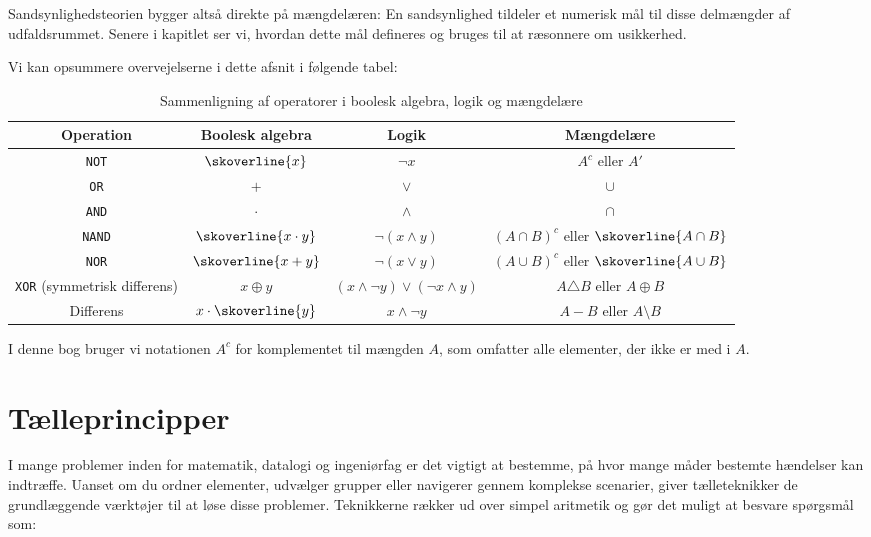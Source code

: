 Sandsynlighedsteorien bygger altså direkte på mængdelæren: En sandsynlighed tildeler et numerisk mål til disse delmængder af udfaldsrummet. Senere i kapitlet ser vi, hvordan dette mål defineres og bruges til at ræsonnere om usikkerhed.

Vi kan opsummere overvejelserne i dette afsnit i følgende tabel:

\begin{table}[h]
    \centering
    \renewcommand{\arraystretch}{1.5} %
    \begin{tabular}{|c|c|c|c|}
    \hline
    \textbf{Operation} & \textbf{Boolesk algebra} & \textbf{Logik} & \textbf{Mængdelære} \\
    \hline
    \texttt{NOT} & $\skoverline{x}$ & $\neg x$ & $A^c$ eller $A'$\\
    \hline
    \texttt{OR} & $+$ & $\vee$ & $\cup$ \\
    \hline
    \texttt{AND} & $\cdot$ & $\wedge$ & $\cap$ \\
    \hline
    \texttt{NAND} & $\skoverline{x \cdot y}$ & $\neg (x \wedge y)$ & $(A \cap B)^c$ eller \(\skoverline{A \cap B}\)\\
    \hline
    \texttt{NOR} & $\skoverline{x + y}$ & $\neg (x \vee y)$ & $(A \cup B)^c$ eller \(\skoverline{A \cup B}\) \\
    \hline
    \texttt{XOR} (symmetrisk differens) & $x \oplus y$ & $(x \wedge \neg y) \vee (\neg x \wedge y)$ & $A \triangle B$ eller \(A \oplus B\) \\
    \hline
    Differens & $x \cdot \skoverline{y}$ & $x \wedge \neg y$ & $A - B$ eller \( A \setminus B \) \\
    \hline
    \end{tabular}
    \caption{Sammenligning af operatorer i boolesk algebra, logik og mængdelære}
\end{table}

I denne bog bruger vi notationen $A^c$ for komplementet til mængden $A$, som omfatter alle elementer, der ikke er med i $A$.

\section{Tælleprincipper}

I mange problemer inden for matematik, datalogi og ingeniørfag er det vigtigt at bestemme, på hvor mange måder bestemte hændelser kan indtræffe. Uanset om du ordner elementer, udvælger grupper eller navigerer gennem komplekse scenarier, giver tælleteknikker de grundlæggende værktøjer til at løse disse problemer. Teknikkerne rækker ud over simpel aritmetik og gør det muligt at besvare spørgsmål som:

